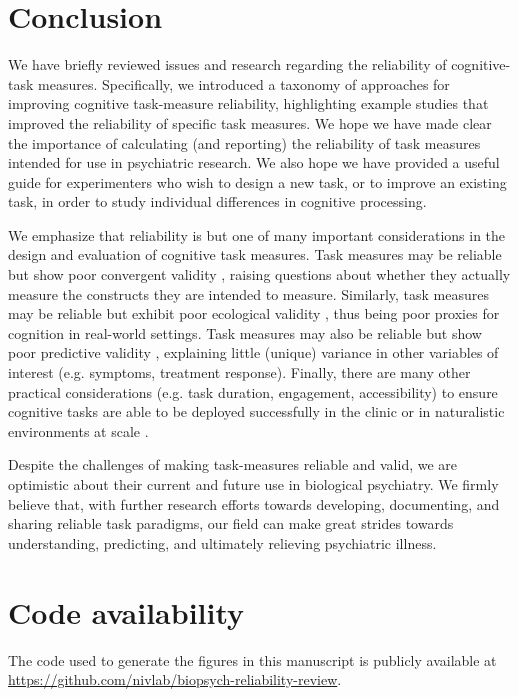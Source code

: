 \documentclass[a4paper,12pt]{article}
\begin{document}
\section{Conclusion}

We have briefly reviewed issues and research regarding the reliability of cognitive-task measures. Specifically, we introduced a taxonomy of approaches for improving cognitive task-measure reliability, highlighting example studies that improved the reliability of specific task measures. We hope we have made clear the importance of calculating (and reporting) the reliability of task measures intended for use in psychiatric research. We also hope we have provided a useful guide for experimenters who wish to design a new task, or to improve an existing task, in order to study individual differences in cognitive processing. 

We emphasize that reliability is but one of many important considerations in the design and evaluation of cognitive task measures. Task measures may be reliable but show poor convergent validity \cite{snijder2022psychometric, eckstein2022interpretation}, raising questions about whether they actually measure the constructs they are intended to measure. Similarly, task measures may be reliable but exhibit poor ecological validity \cite{Steiner2021-oq}, thus being poor proxies for cognition in real-world settings. Task measures may also be reliable but show poor predictive validity \cite{verdejo2021unified}, explaining little (unique) variance in other variables of interest (e.g. symptoms, treatment response). Finally, there are many other practical considerations (e.g. task duration, engagement, accessibility) to ensure cognitive tasks are able to be deployed successfully in the clinic or in naturalistic environments at scale \cite{germine2021toward}. 

Despite the challenges of making task-measures reliable and valid, we are optimistic about their current and future use in biological psychiatry. We firmly believe that, with further research efforts towards developing, documenting, and sharing reliable task paradigms, our field can make great strides towards understanding, predicting, and ultimately relieving psychiatric illness.

\section{Code availability}

The code used to generate the figures in this manuscript is publicly available at \break \url{https://github.com/nivlab/biopsych-reliability-review}.
\end{document}
